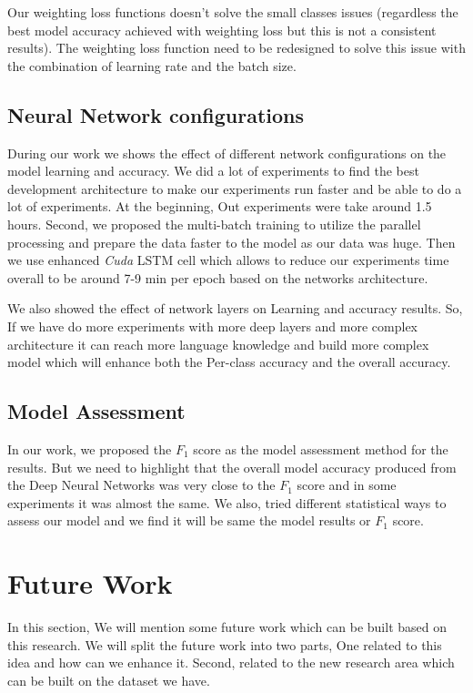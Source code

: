 Our weighting loss functions doesn't solve the small classes issues (regardless the best model accuracy achieved with weighting loss but this is not a consistent results). The weighting loss function need to be redesigned to solve this issue with the combination of learning rate and the batch size.


\subsection{Neural Network configurations}

During our work we shows the effect of different network configurations on the model learning and accuracy. We did a lot of experiments to find the best development architecture to make our experiments run faster and be able to do a lot of experiments. At the beginning, Out experiments were take around 1.5 hours. Second, we proposed the multi-batch training to utilize the parallel processing and prepare the data faster to the model as our data was huge. Then we use enhanced \textit{Cuda} LSTM cell which allows to reduce our experiments time overall to be around 7-9 min per epoch based on the networks architecture. 

We also showed the effect of network layers on Learning and accuracy results. So, If we have do more experiments with more deep layers and more complex architecture it can reach more language knowledge and build more complex model which will enhance both the Per-class accuracy and the overall accuracy.

\subsection{Model Assessment}

In our work, we proposed the $F_1$ score as the model assessment method for the results. But we need to highlight that the overall model accuracy produced from the Deep Neural Networks was very close to the $F_1$ score and in some experiments it was almost the same. We also, tried different statistical ways to assess our model and we find it will be same the model results or $F_1$ score.

  \section{Future Work}

  In this section, We will mention some future work which can be built based on this research. We will split the future work into two parts, One related to this idea and how can we enhance it. Second, related to the new research area which can be built on the dataset we have.

